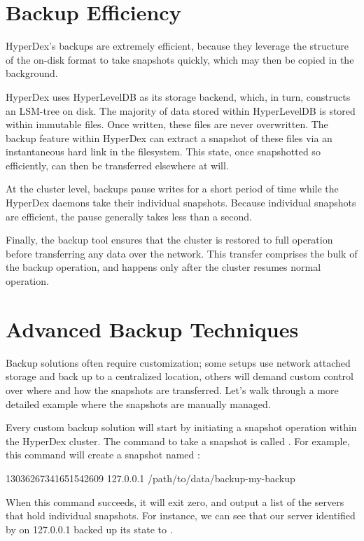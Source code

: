 \section{Backup Efficiency}

HyperDex's backups are extremely efficient, because they leverage the structure
of the on-disk format to take snapshots quickly, which may then be copied in the
background.

HyperDex uses HyperLevelDB as its storage backend, which, in turn, constructs an
LSM-tree on disk.  The majority of data stored within HyperLevelDB is stored
within immutable  files.  Once written, these files are never
overwritten.  The backup feature within HyperDex can extract a snapshot of these
files via an instantaneous hard link in the filesystem. This state, once
snapshotted so efficiently, can then be transferred elsewhere at will. 

At the cluster level, backups pause writes for a short period of time while the
HyperDex daemons take their individual snapshots.  Because individual snapshots
are efficient, the pause generally takes less than a second.

Finally, the backup tool ensures that the cluster is restored to full operation
before transferring any data over the network.  This transfer comprises the bulk
of the backup operation, and happens only after the cluster resumes normal
operation.

\section{Advanced Backup Techniques}

Backup solutions often require customization; some setups use network attached
storage and back up to a centralized location, others will demand custom control
over where and how the snapshots are transferred.  Let's walk through a more
detailed example where the snapshots are manually managed.

Every custom backup solution will start by initiating a snapshot operation
within the HyperDex cluster.  The command to take a snapshot is called
.  For example, this command will create a snapshot named
:

\begin{consolecode}
13036267341651542609 127.0.0.1 /path/to/data/backup-my-backup
\end{consolecode}

When this command succeeds, it will exit zero, and output a list of the servers
that hold individual snapshots.  For instance, we can see that our server
identified by  on 127.0.0.1 backed up its state to
.

